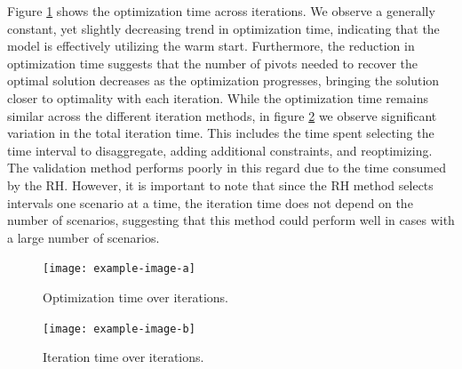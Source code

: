 Figure \ref{fig:opt_time_over_iter} shows the optimization time across iterations.
 We observe a generally constant, yet slightly decreasing trend in optimization time, indicating that the model is effectively utilizing the warm start. Furthermore, the reduction in optimization time suggests that the number of pivots needed to recover the optimal solution decreases as the optimization progresses, bringing the solution closer to optimality with each iteration.
 While the optimization time remains similar across the different iteration methods, in figure \ref{fig:iter_time_over_iter} we observe significant variation in the total iteration time. This includes the time spent selecting the time interval to disaggregate, adding additional constraints, and reoptimizing. 
 The validation method performs poorly in this regard due to the time consumed by the RH. However, it is important to note that since the RH method selects intervals one scenario at a time, the iteration time does not depend on the number of scenarios, suggesting that this method could perform well in cases with a large number of scenarios.
 

\begin{figure}[H]
  \centering
  \texttt{[image: example-image-a]}%
  \caption{Optimization time over iterations.}
  \label{fig:opt_time_over_iter}
\end{figure}

\begin{figure}[H]
  \centering
  \texttt{[image: example-image-b]}%
  \caption{Iteration time over iterations.}
  \label{fig:iter_time_over_iter}
\end{figure}
















